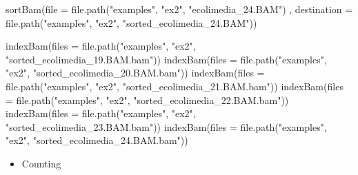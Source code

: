 \documentclass[
]{book}
\newenvironment{Shaded}{\begin{snugshade}}{\end{snugshade}}
\newcommand{\AttributeTok}[1]{\textcolor[rgb]{0.77,0.63,0.00}{#1}}
\newcommand{\FunctionTok}[1]{\textcolor[rgb]{0.00,0.00,0.00}{#1}}
\newcommand{\NormalTok}[1]{#1}
\newcommand{\StringTok}[1]{\textcolor[rgb]{0.31,0.60,0.02}{#1}}
\providecommand{\tightlist}{%
  \setlength{\itemsep}{0pt}\setlength{\parskip}{0pt}}
\begin{document}
\begin{Shaded}
\begin{Highlighting}[]
\FunctionTok{sortBam}\NormalTok{(}\AttributeTok{file =} \FunctionTok{file.path}\NormalTok{(}\StringTok{"examples"}\NormalTok{, }\StringTok{"ex2"}\NormalTok{, }\StringTok{"ecolimedia\_24.BAM"}\NormalTok{)}
\NormalTok{        , }\AttributeTok{destination =} \FunctionTok{file.path}\NormalTok{(}\StringTok{"examples"}\NormalTok{, }\StringTok{"ex2"}\NormalTok{, }\StringTok{"sorted\_ecolimedia\_24.BAM"}\NormalTok{))}

\FunctionTok{indexBam}\NormalTok{(}\AttributeTok{files =} \FunctionTok{file.path}\NormalTok{(}\StringTok{"examples"}\NormalTok{, }\StringTok{"ex2"}\NormalTok{, }\StringTok{"sorted\_ecolimedia\_19.BAM.bam"}\NormalTok{))}
\FunctionTok{indexBam}\NormalTok{(}\AttributeTok{files =} \FunctionTok{file.path}\NormalTok{(}\StringTok{"examples"}\NormalTok{, }\StringTok{"ex2"}\NormalTok{, }\StringTok{"sorted\_ecolimedia\_20.BAM.bam"}\NormalTok{))}
\FunctionTok{indexBam}\NormalTok{(}\AttributeTok{files =} \FunctionTok{file.path}\NormalTok{(}\StringTok{"examples"}\NormalTok{, }\StringTok{"ex2"}\NormalTok{, }\StringTok{"sorted\_ecolimedia\_21.BAM.bam"}\NormalTok{))}
\FunctionTok{indexBam}\NormalTok{(}\AttributeTok{files =} \FunctionTok{file.path}\NormalTok{(}\StringTok{"examples"}\NormalTok{, }\StringTok{"ex2"}\NormalTok{, }\StringTok{"sorted\_ecolimedia\_22.BAM.bam"}\NormalTok{))}
\FunctionTok{indexBam}\NormalTok{(}\AttributeTok{files =} \FunctionTok{file.path}\NormalTok{(}\StringTok{"examples"}\NormalTok{, }\StringTok{"ex2"}\NormalTok{, }\StringTok{"sorted\_ecolimedia\_23.BAM.bam"}\NormalTok{))}
\FunctionTok{indexBam}\NormalTok{(}\AttributeTok{files =} \FunctionTok{file.path}\NormalTok{(}\StringTok{"examples"}\NormalTok{, }\StringTok{"ex2"}\NormalTok{, }\StringTok{"sorted\_ecolimedia\_24.BAM.bam"}\NormalTok{))}
\end{Highlighting}
\end{Shaded}

\begin{itemize}
\tightlist
\item
  Counting
\end{itemize}
\end{document}
